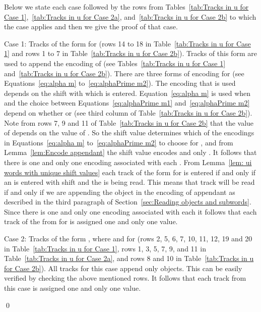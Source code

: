 \documentclass[11pt]{article} \usepackage{amsfonts,amsmath,amssymb,amsthm}
\renewenvironment{proof}{{\bfseries\noindent Proof.}}{\qed\vspace{3.5ex}}
\begin{document}
\begin{proof} 
Below we state each case followed by the rows from Tables~\ref{tab:Tracks in u for Case 1},~\ref{tab:Tracks in u for Case 2a}, and~\ref{tab:Tracks in u for Case 2b} to which the case applies and then we give the proof of that case.

Case 1: Tracks of the form  for  (rows 14 to 18 in Table~\ref{tab:Tracks in u for Case 1} and rows 1 to 7 in Table~\ref{tab:Tracks in u for Case 2b}).
Tracks of this form are used to append the encoding of  (see Tables~\ref{tab:Tracks in u for Case 1} and~\ref{tab:Tracks in u for Case 2b}). 
There are three forms of encoding for  (see Equations~\eqref{eq:alpha m} to~\eqref{eq:alphaPrime m2}). 
The encoding that is used depends on the shift  with which  is entered. Equation~\eqref{eq:alpha m} is used when  and the choice between Equations~\eqref{eq:alphaPrime m1} and~\eqref{eq:alphaPrime m2} depend on whether  or  (see third column of Table~\ref{tab:Tracks in u for Case 2b}).
Note from rows 7, 9 and 11 of Table~\ref{tab:Tracks in u for Case 2b} that the value of  depends on the value of .
So the shift value  determines which of the encodings in Equations~\eqref{eq:alpha m} to~\eqref{eq:alphaPrime m2} to choose for , and from Lemma~\ref{lem:Encode appendant} the shift value  encodes  and only . 
It follows that there is one and only one encoding associated with each .
From Lemma~\ref{lem: ui words with unique shift values} each track of the form  for  is entered if and only if an  is entered with shift  and the   is being read. 
This means that track  will be read if and only if we are appending the  object in the encoding of appendant  as described in the third paragraph of Section~\ref{sec:Reading objects and  subwords}.
Since there is one and only one encoding associated with each  it follows that each track of the from  for  is assigned one and only one value.  


Case 2: Tracks of the form , where  and  for  (rows 2, 5, 6, 7, 10, 11, 12, 19 and 20 in Table~\ref{tab:Tracks in u for Case 1}, rows 1, 3, 5, 7, 9, and 11 in Table~\ref{tab:Tracks in u for Case 2a}, and rows 8 and 10 in Table~\ref{tab:Tracks in u for Case 2b}). All  tracks for this case append only  objects. This can be easily verified by checking the above mentioned rows. It follows that each track from this case is assigned one and only one value.


\end{proof}
\end{document}
